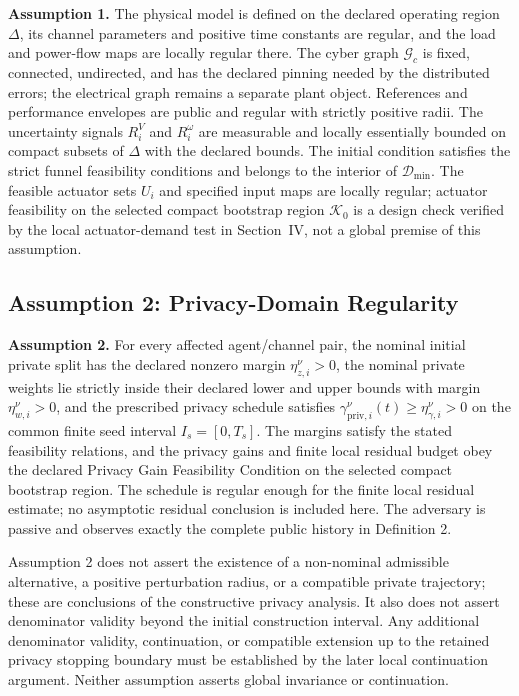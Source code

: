 \documentclass[journal]{IEEEtran}
\begin{document}
\textbf{Assumption 1.} The physical model is defined on the declared
operating region $\Delta$, its channel parameters and positive time constants
are regular, and the load and power-flow maps are locally regular there. The
cyber graph $\mathcal G_c$ is fixed, connected, undirected, and has the declared
pinning needed by the distributed errors; the electrical graph remains a
separate plant object. References and performance envelopes are public and
regular with strictly positive radii. The uncertainty signals $R_i^V$ and
$R_i^\omega$ are measurable and locally essentially bounded on compact subsets
of $\Delta$ with the declared bounds. The initial condition satisfies the
strict funnel feasibility conditions and belongs to the interior of
$\mathcal D_{\min}$. The feasible actuator sets $U_i$ and specified input maps are
locally regular; actuator feasibility on the selected compact bootstrap region
$\mathcal K_0$ is a design
check verified by the local actuator-demand test in Section~IV, not a global
premise of this assumption.

\subsection{Assumption 2: Privacy-Domain Regularity}

\textbf{Assumption 2.} For every affected agent/channel pair, the nominal
initial private split has the declared nonzero margin $\eta_{z,i}^\nu>0$,
the nominal private weights lie strictly inside their declared lower and upper
bounds with margin
$\eta_{w,i}^\nu>0$, and the prescribed privacy schedule satisfies
$\gamma_{\mathrm{priv},i}^\nu(t)\geq\eta_{\gamma,i}^\nu>0$ on the common finite
seed interval $I_s=[0,T_s]$. The margins satisfy the stated feasibility
relations, and the privacy gains and finite local residual budget obey the
declared Privacy Gain Feasibility Condition on the selected compact bootstrap
region. The schedule is regular enough for the finite local residual estimate;
no asymptotic residual conclusion is included here. The adversary is passive
and observes exactly the complete public history in Definition 2.

Assumption 2 does not assert the existence of a non-nominal admissible
alternative, a positive perturbation radius, or a compatible private trajectory;
these are conclusions of the constructive privacy analysis. It also does not
assert denominator validity beyond the initial construction interval. Any
additional denominator validity, continuation, or compatible extension up to
the retained privacy stopping boundary must be established by the later local
continuation argument. Neither assumption asserts global invariance or
continuation.
\end{document}
